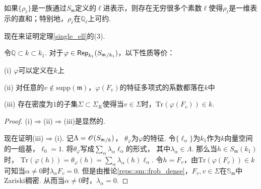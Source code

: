\begin{ccor}
    如果$\{\rho_{\ell}\}$是一族通过$S_{\mathfrak{m}}$定义的$\ell$进表示，则存在无穷很多个素数$\ell$使得$\rho_{\ell}$是一维表示的直和；特别地，$\rho_{\ell}$在$\mathbb{Q}_{\ell}$上可约.\label{sm_to_reducile}
\end{ccor}

现在来证明定理\ref{single_ell}的(3).

\begin{cprop}
    令$\mathbb{Q}\subset k\subset k_1$. 对于$\varphi\in \mathsf{Rep}_{k_1}({S_{\mathfrak{m}}}_{/k_1})$，以下性质等价：

    (i) $\varphi$可以定义在$k$上

    (ii) 对任意的$v\not\in \mathrm{supp}(\mathfrak{m})$，$\varphi(F_v)$的特征多项式的系数都落在$k$中

    (iii) 存在密度为$1$的子集$\Sigma \subset \Sigma_K$使得当$v\in \Sigma$时，$\mathrm{Tr}(\varphi(F_v))\in k$.
\end{cprop}

\begin{proof}
    (i)$\Rightarrow$(ii)$\Rightarrow$(iii)是显然的.
    
    现在证明(iii)$\Rightarrow$(i). 记$\Lambda = \mathscr{O}({S_{\mathfrak{m}}}_{/k})$，
    $\theta_{\varphi}$为$\varphi$的特征.
    令$\{\ell_{\alpha}\}$为$k_1$作为$k$向量空间的一组基，$\ell_{0} = 1$.
    将$\theta_{\varphi}$写成$\sum_{\alpha} \lambda_{\alpha} \ell_{\alpha}$的形式，
    其中$\lambda_{\alpha}\in \Lambda$.
    那么当$h\in S_{\mathfrak{m}}(k_1)$时，
    $\mathrm{Tr}(\varphi(h)) = \theta_{\varphi}(h) = \sum_{\alpha} \lambda_{\alpha}(h)\ell_{\alpha}$.
    令$h=F_v$，由$\mathrm{Tr}(\varphi(F_v))\in k$可知当$\alpha\neq 0$时$\lambda_{\alpha}F_v = 0$.
    但是由推论\ref{reps::sm::frob_dense}，$F_v,v\in \Sigma$在$\mathbb{S}_{\mathfrak{m}}$中
    Zariski稠密. 从而当$\alpha\neq 0$时，$\lambda_{\alpha} = 0$.
\end{proof}
